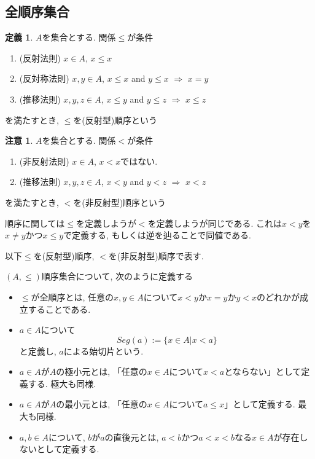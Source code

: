 \documentclass[dvipdfmx,a4paper,11pt]{article}
\theoremstyle{definition}
\newtheorem{dfn}[thm]{定義}
\newtheorem{rem}[thm]{注意}
\begin{document}
\subsection{全順序集合}
 \begin{tcolorbox}[colback = white, colframe = green!35!black, fonttitle = \bfseries,breakable = true]
 \begin{dfn}
 $A$を集合とする. 関係$\le$が条件
 \begin{enumerate}
 \item (反射法則) $x \in A$, $x \le x$
 \item (反対称法則) $x,y \in A$, $x \le x$ and $y \le x$ $\Rightarrow$ $x=y$
 \item (推移法則) $x,y, z\in A$, $x \le y$ and $y \le z$ $\Rightarrow$ $x\le z$
 \end{enumerate}
を満たすとき, $\le$を(反射型)順序という
\end{dfn}
 \end{tcolorbox}
 \begin{rem}
  $A$を集合とする. 関係$<$が条件
   \begin{enumerate}
 \item (非反射法則) $x \in A$, $x < x$ではない. 
 \item (推移法則) $x,y, z\in A$, $x < y$ and $y < z$ $\Rightarrow$ $x < z$
 \end{enumerate}
を満たすとき, $<$を(非反射型)順序という

順序に関しては$\le$を定義しようが$<$を定義しようが同じである. 
これは$x< y$を$x \neq y$かつ$x \le y$で定義する, もしくは逆を辿ることで同値である.

以下$\le$を(反射型)順序, $<$を(非反射型)順序で表す. 
 \end{rem}

 
 \begin{tcolorbox}
 [colback = white, colframe = green!35!black, fonttitle = \bfseries,breakable = true]
$(A,\le)$順序集合について, 次のように定義する
\begin{itemize}
\item $\le$が全順序とは, 任意の$x, y \in A$について$x <y$か$x=y$か$y < x$のどれかが成立することである. 
\item $a \in A$について
$$
Seg(a) := \{ x \in A | x < a\}
$$
と定義し, $a$による始切片という.
\item $a \in A$が$A$の極小元とは, 「任意の$x\in A$について$x<a$とならない」として定義する. 極大も同様.
\item $a \in A$が$A$の最小元とは, 「任意の$x\in A$について$a\le x$」として定義する. 最大も同様.
\item $a, b\in A$について, $b$が$a$の直後元とは, $a < b$かつ$a < x < b$なる$x \in A$が存在しないとして定義する. 
\end{itemize}
\end{tcolorbox}
\end{document}
